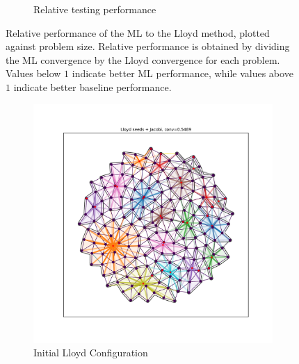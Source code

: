\documentclass{article}
\begin{document}
\begin{figure}[h]
\begin{subfigure}[t]{0.49\textwidth}
    \caption{Relative testing performance}
  \end{subfigure}
  \caption{Relative performance of the ML to the Lloyd method, plotted against problem size.  Relative performance is obtained by dividing the ML convergence by the Lloyd convergence for each problem.  Values below $1$ indicate better ML performance, while values above $1$ indicate better baseline performance.}
  \label{fig:rel_conv}
\end{figure}

\begin{figure}[h]
  \centering
  \begin{subfigure}[t]{0.32\textwidth}
    \centering
    \includegraphics[width=\textwidth, trim=80 70 70 50, clip]{grid_circle_dumb.pdf}
    \caption{Initial Lloyd Configuration}
  \end{subfigure}
  \begin{subfigure}[t]{0.32\textwidth}
    \centering

\end{subfigure}
\end{figure}
\end{document}
